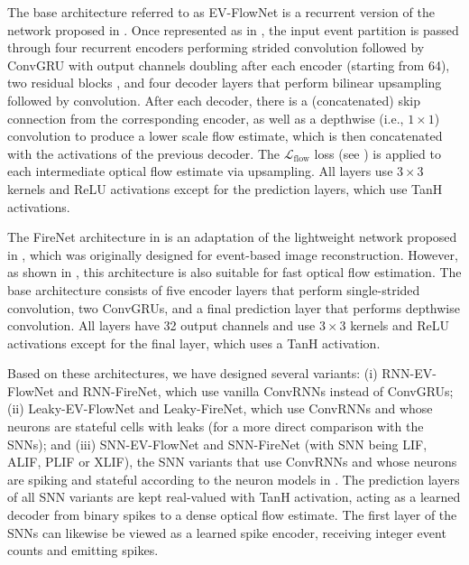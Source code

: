 The base architecture referred to as EV-FlowNet is a recurrent version of the network proposed in \cite{zhu2018evflownet}. Once represented as in , the input event partition is passed through four recurrent encoders performing strided convolution followed by ConvGRU \cite{ballas2016delving} with output channels doubling after each encoder (starting from 64), two residual blocks \cite{fang2021deep,he2016deep}, and four decoder layers that perform bilinear upsampling followed by convolution. After each decoder, there is a (concatenated) skip connection from the corresponding encoder, as well as a depthwise (i.e., $1\times 1$) convolution to produce a lower scale flow estimate, which is then concatenated with the activations of the previous decoder. The $\mathcal{L}_{\text{flow}}$ loss (see ) is applied to each intermediate optical flow estimate via upsampling. All layers use $3\times 3$ kernels and ReLU activations except for the prediction layers, which use TanH activations.

The FireNet architecture in  is an adaptation of the lightweight network proposed in \cite{scheerlinck2020fast}, which was originally designed for event-based image reconstruction. However, as shown in \cite{paredes-valles2021back}, this architecture is also suitable for fast optical flow estimation. The base architecture consists of five encoder layers that perform single-strided convolution, two ConvGRUs, and a final prediction layer that performs depthwise convolution. All layers have 32 output channels and use $3\times 3$ kernels and ReLU activations except for the final layer, which uses a TanH activation.

Based on these architectures, we have designed several variants: (i) RNN-EV-FlowNet and RNN-FireNet, which use vanilla ConvRNNs instead of ConvGRUs; (ii) Leaky-EV-FlowNet and Leaky-FireNet, which use ConvRNNs and whose neurons are stateful cells with leaks (for a more direct comparison with the SNNs); and (iii) SNN-EV-FlowNet and SNN-FireNet (with SNN being LIF, ALIF, PLIF or XLIF), the SNN variants that use ConvRNNs and whose neurons are spiking and stateful according to the neuron models in . The prediction layers of all SNN variants are kept real-valued with TanH activation, acting as a learned decoder from binary spikes to a dense optical flow estimate. The first layer of the SNNs can likewise be viewed as a learned spike encoder, receiving integer event counts and emitting spikes.

